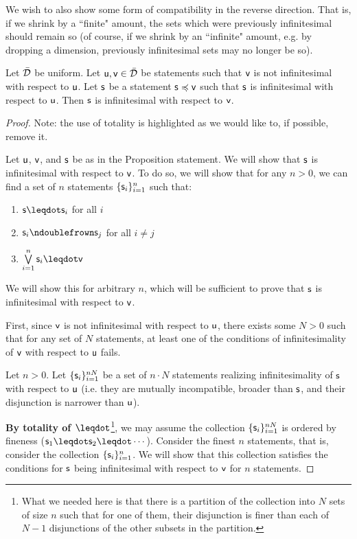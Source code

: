 \documentclass[10pt, onecolumn, longbibliography, nofootinbib]{revtex4-2}
\begin{document}
We wish to also show some form of compatibility in the reverse direction. That is, if we shrink by a ``finite" amount, the sets which were previously infinitesimal should remain so (of course, if we shrink by an ``infinite" amount, e.g. by dropping a dimension, previously infinitesimal sets may no longer be so). 

\begin{prop}
	Let $\tdomain$ be uniform. Let $\stmt[u],\stmt[v] \in \tdomain$ be statements such that $\stmt[v]$ is not infinitesimal with respect to $\stmt[u]$. Let $\stmt$ be a statement $\stmt\narrower\stmt[v]$ such that $\stmt$ is infinitesimal with respect to $\stmt[u]$. Then $\stmt$ is infinitesimal with respect to $\stmt[v]$. 
\end{prop}
\begin{proof}
	Note: the use of totality is highlighted as we would like to, if possible, remove it.
	
	Let $\stmt[u]$, $\stmt[v]$, and $\stmt$ be as in the Proposition statement. We will show that $\stmt$ is infinitesimal with respect to $\stmt[v]$. To do so, we will show that for any $n>0$, we can find a set of $n$ statements $\{\stmt_i\}_{i=1}^n$ such that: 
	\begin{enumerate}
		\item $\stmt \finer \stmt_i$ for all $i$
		\item $\stmt_i \ncomp \stmt_j$ for all $i \neq j$
		\item $\bigOR\limits_{i=1}^n \stmt_i \finer \stmt[v]$ 
	\end{enumerate}
	We will show this for arbitrary $n$, which will be sufficient to prove that $\stmt$ is infinitesimal with respect to $\stmt[v]$. 
	
	First, since $\stmt[v]$ is not infinitesimal with respect to $\stmt[u]$, there exists some $N>0$ such that for any set of $N$ statements, at least one of the conditions of infinitesimality of $\stmt[v]$ with respect to $\stmt[u]$ fails. 
	
	Let $n>0$. Let $\{\stmt_i\}_{i=1}^{nN}$ be a set of $n\cdot N$ statements realizing infinitesimality of $\stmt$ with respect to $\stmt[u]$ (i.e. they are mutually incompatible, broader than $\stmt$, and their disjunction is narrower than $\stmt[u]$). 
	
	{\bf By totality of $\finer$}\footnote{What we needed here is that there is a partition of the collection into $N$ sets of size $n$ such that for one of them, their disjunction is finer than each of $N-1$ disjunctions of the other subsets in the partition.}, we may assume the collection $\{\stmt_i\}_{i=1}^{nN}$ is ordered by fineness ($\stmt_1\finer\stmt_2\finer\cdots$). Consider the finest $n$ statements, that is, consider the collection $\{\stmt_i\}_{i=1}^{n}$. We will show that this collection satisfies the conditions for $\stmt$ being infinitesimal with respect to $\stmt[v]$ for $n$ statements. 
	

\end{proof}
\end{document}
